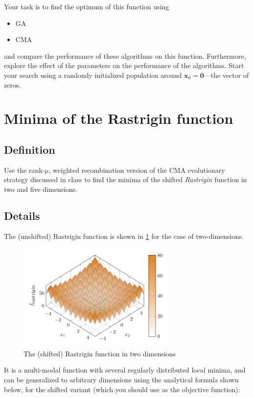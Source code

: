 \documentclass[11pt]{article}
\begin{document}
Your task is to find the optimum of this function using
\begin{itemize}
\item GA
\item CMA
\end{itemize}
and compare the performance of these algorithms on this function. Furthermore,
explore the effect of the parameters on the performance of the algorithms.
Start your search using a randomly initialized population around \(\mathbf{x}_0 = \mathbf{0}\)---the vector of zeros.

\section{Minima of the Rastrigin function}
\label{sec:orgee6ffd4}
\subsection{Definition}
\label{sec:org3f11070}
  Use the rank-\(\mu\), weighted recombination version of the CMA
evolutionary strategy discussed in class to find the minima of the shifted
\emph{Rastrigin} function in two and five dimensions.

\subsection{Details}
\label{sec:orgb684f03}
The (unshifted) Rastrigin function is shown in \cref{rastr} for the case of two-dimensions.

\begin{figure}[htbp]
\centering
\includegraphics[width=0.7\textwidth]{images/shifted_rastrigin.pdf}
\caption{\label{rastr}
The (shifted) Rastrigin function in two dimensions}
\end{figure}


It is a multi-modal function with several regularly distributed local minima,
and can be generalized to arbitrary dimensions using the analytical formula
shown below, for the shifted variant (which you should use as the objective
function):
\end{document}
